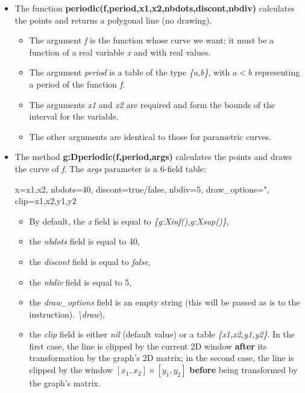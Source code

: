 \begin{itemize}
    \item The function \textbf{periodic(f,period,x1,x2,nbdots,discont,nbdiv)} calculates the points and returns a polygonal line (no drawing).

\begin{itemize}
    \item The argument \emph{f} is the function whose curve we want; it must be a function of a real variable \emph{x} and with real values.
    \item The argument \emph{period} is a table of the type \emph{\{a,b\}}, with \(a<b\) representing a period of the function \emph{f}.
    \item The arguments \emph{x1} and \emph{x2} are required and form the bounds of the interval for the variable.
    \item The other arguments are identical to those for parametric curves. \end{itemize}
    \item The method \textbf{g:Dperiodic(f,period,args)} calculates the points and draws the curve of \emph{f}. The \emph{args} parameter is a 6-field table:

\begin{TeXcode}
{ x={x1,x2}, nbdots=40, discont=true/false, nbdiv=5, draw_options=", clip={x1,x2,y1,y2} }
\end{TeXcode}

\begin{itemize}
    \item By default, the \emph{x} field is equal to \emph{\{g:Xinf(),g:Xsup()\}},
    \item the \emph{nbdots} field is equal to 40,
    \item the \emph{discont} field is equal to \emph{false},
    \item the \emph{nbdiv} field is equal to 5,
    \item the \emph{draw\_options} field is an empty string (this will be passed as is to the instruction). \emph{\textbackslash draw}),
    \item the \emph{clip} field is either \emph{nil} (default value) or a table \emph{\{x1,x2,y1,y2\}}. In the first case, the line is clipped by the current 2D window \textbf{after} its transformation by the graph's 2D matrix; in the second case, the line is clipped by the window $[x_1,x_2]\times[y_1,y_2]$ \textbf{before} being transformed by the graph's matrix.

\end{itemize}

\end{itemize}

